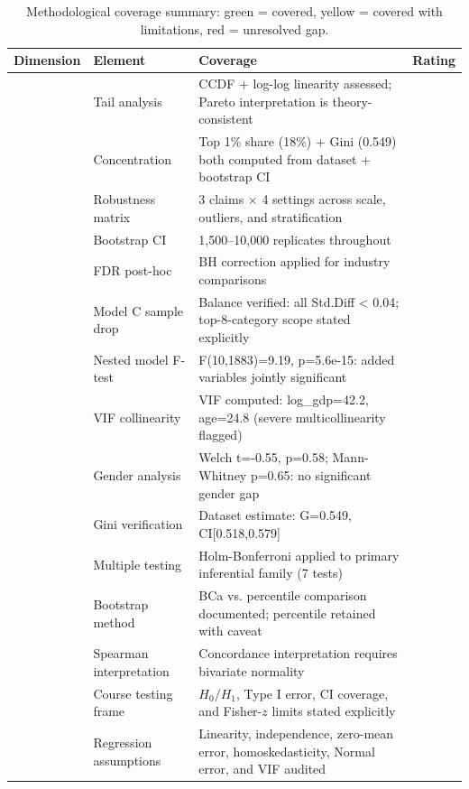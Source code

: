\documentclass[a4paper,10pt]{article}
\begin{document}
\begin{table}[H]
\centering
\caption{Methodological coverage summary: green = covered, yellow = covered with limitations, red = unresolved gap.}
\label{tab:selfassess}
\small
\begin{tabular}{llp{6.5cm}c}
\toprule
Dimension & Element & Coverage & Rating \\
\midrule
 & Tail analysis & CCDF + log-log linearity assessed; Pareto interpretation is theory-consistent & \cellcolor{green!25} \\
 & Concentration & Top 1\% share (18\%) + Gini (0.549) both computed from dataset + bootstrap CI & \cellcolor{green!25} \\
 & Robustness matrix & 3 claims × 4 settings across scale, outliers, and stratification & \cellcolor{green!25} \\
 & Bootstrap CI & 1,500--10,000 replicates throughout & \cellcolor{green!25} \\
 & FDR post-hoc & BH correction applied for industry comparisons & \cellcolor{green!25} \\
\midrule
 & Model C sample drop & Balance verified: all Std.Diff < 0.04; top-8-category scope stated explicitly & \cellcolor{yellow!25} \\
 & Nested model F-test & F(10,1883)=9.19, p=5.6e-15: added variables jointly significant & \cellcolor{green!25} \\
 & VIF collinearity & VIF computed: log\_gdp=42.2, age=24.8 (severe multicollinearity flagged) & \cellcolor{yellow!25} \\
 & Gender analysis & Welch t=-0.55, p=0.58; Mann-Whitney p=0.65: no significant gender gap & \cellcolor{green!25} \\
 & Gini verification & Dataset estimate: G=0.549, CI[0.518,0.579] & \cellcolor{green!25} \\
 & Multiple testing & Holm-Bonferroni applied to primary inferential family (7 tests) & \cellcolor{green!25} \\
 & Bootstrap method & BCa vs. percentile comparison documented; percentile retained with caveat & \cellcolor{yellow!25} \\
 & Spearman interpretation & Concordance interpretation requires bivariate normality & \cellcolor{yellow!25} \\
 & Course testing frame & $H_0/H_1$, Type I error, CI coverage, and Fisher-$z$ limits stated explicitly & \cellcolor{green!25} \\
 & Regression assumptions & Linearity, independence, zero-mean error, homoskedasticity, Normal error, and VIF audited & \cellcolor{green!25} \\

\end{tabular}
\end{table}
\end{document}

